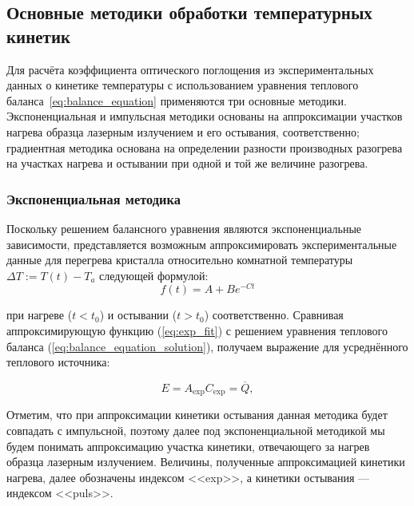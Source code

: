 \subsection{Основные методики обработки температурных кинетик}
Для расчёта коэффициента оптического поглощения из экспериментальных данных о кинетике температуры с использованием уравнения теплового баланса~\cref{eq:balance_equation} применяются три основные методики. Экспоненциальная и импульсная методики основаны на аппроксимации участков нагрева образца лазерным излучением и его остывания, соответственно; градиентная методика основана на определении разности производных разогрева на участках нагрева и остывании при одной и той же величине разогрева.


\subsubsection{Экспоненциальная методика}
Поскольку решением балансного уравнения являются экспоненциальные зависимости, представляется возможным аппроксимировать экспериментальные данные для перегрева кристалла относительно комнатной температуры $\Delta T := T(t) - T_a$ следующей формулой:
\begin{equation}
	f(t) = A + Be^{-Ct}
	\label{eq:exp_fit}
\end{equation}

при нагреве ($t < t_0$) и остывании ($t > t_0$) соответственно. Сравнивая аппроксимирующую функцию (\ref{eq:exp_fit}) с решением уравнения теплового баланса (\ref{eq:balance_equation_solution}), получаем выражение для усреднённого теплового источника:

\begin{equation}
	E = A_{\text{exp}}C_{\text{exp}} = \overline{Q},
	\label{eq:barq_exp}
\end{equation}


Отметим, что при аппроксимации кинетики остывания данная методика будет совпадать с импульсной, поэтому далее под экспоненциальной методикой мы будем понимать аппроксимацию участка кинетики, отвечающего за нагрев образца лазерным излучением. Величины, полученные аппроксимацией кинетики нагрева, далее обозначены индексом <<exp>>, а кинетики остывания --- индексом <<puls>>.


